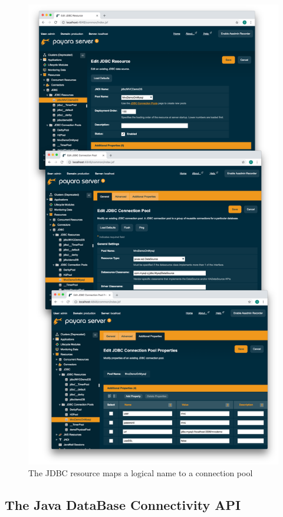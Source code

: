 \begin{figure}[]
	\centering
    \includegraphics[width=1.0\linewidth]{Figures/screenshot-jdbc.pdf}
	\caption{The JDBC resource maps a logical name to a connection pool}
  \label{fig:jdbcResource}
\end{figure}

\subsection{The Java DataBase Connectivity API}

